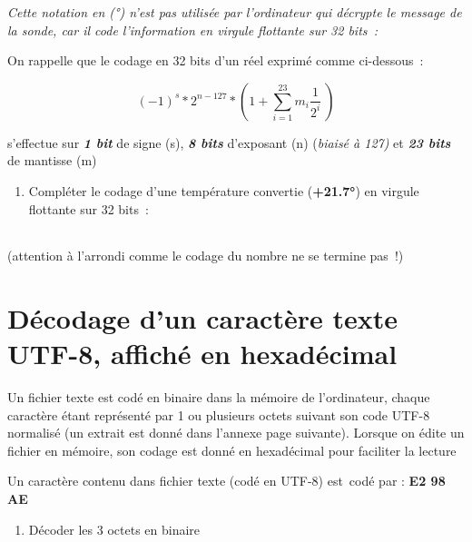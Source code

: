 \begin{longtable}[]{@{}llllllllll@{}}
\toprule
\endhead
& & & & & & & & &\tabularnewline
\bottomrule
\end{longtable}

\emph{Cette notation en (°) n'est pas utilisée par l'ordinateur qui
décrypte le message de la sonde, car il code l'information en virgule
flottante sur 32 bits~:}

On rappelle que le codage en 32 bits d'un réel exprimé comme
ci-dessous~:

\[( - 1)^{s}*2^{n - 127}*(1 + \sum_{i = 1}^{23}{m_{i}\frac{1}{2^{i}}}\ )\]

s'effectue sur \emph{\textbf{1 bit}} de signe (s), \emph{\textbf{8
bits}} d'exposant (n) (\emph{biaisé à 127)} et \emph{\textbf{23 bits}}
de mantisse (m)

\begin{enumerate}
\def\labelenumi{\arabic{enumi}.}
\setcounter{enumi}{6}
\item
  Compléter le codage d'une température convertie (\textbf{+21.7°}) en
  virgule flottante sur 32 bits~:
\end{enumerate}

\begin{longtable}[]{@{}llllllllllllllllllllllllllllllll@{}}
\toprule
\endhead
& & & & & & & & & & & & & & & & & & & & & & & & & & & & & &
&\tabularnewline
\bottomrule
\end{longtable}

(attention à l'arrondi comme le codage du nombre ne se termine pas~!)

\hypertarget{duxe9codage-dun-caractuxe8re-texte-utf-8-affichuxe9-en-hexaduxe9cimal}{%
\section{Décodage d'un caractère texte UTF-8, affiché en
hexadécimal}\label{duxe9codage-dun-caractuxe8re-texte-utf-8-affichuxe9-en-hexaduxe9cimal}}

Un fichier texte est codé en binaire dans la mémoire de l'ordinateur,
chaque caractère étant représenté par 1 ou plusieurs octets suivant son
code UTF-8 normalisé (un extrait est donné dans l'annexe page suivante).
Lorsque on édite un fichier en mémoire, son codage est donné en
hexadécimal pour faciliter la lecture

Un caractère contenu dans fichier texte (codé en UTF-8) est~codé par :
\textbf{E2 98 AE}

\begin{enumerate}
\def\labelenumi{\arabic{enumi}.}
\setcounter{enumi}{7}
\item
  Décoder les 3 octets en binaire
\end{enumerate}

